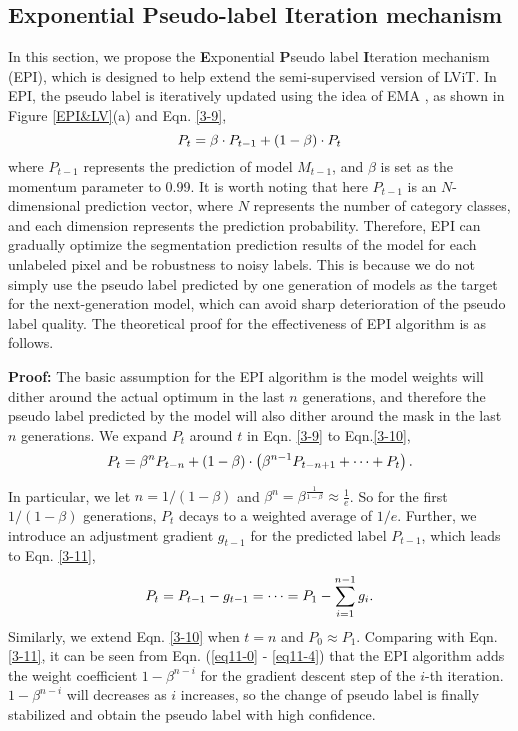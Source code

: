 \documentclass[lettersize,journal]{IEEEtran}
\begin{document}
\subsection{\textbf{E}xponential \textbf{P}seudo-label \textbf{I}teration mechanism}
In this section, we propose the \textbf{E}xponential \textbf{P}seudo label \textbf{I}teration mechanism (EPI), which is designed to help extend the semi-supervised version of LViT. In EPI, the pseudo label is iteratively updated using the idea of EMA \cite{7grill2020bootstrap}, as shown in Figure \ref{EPI&LV}(a) and Eqn. \ref{3-9},
\begin{equation}
    \setlength{\belowdisplayskip}{3pt}
    P_{t}=\beta \cdot P_{t-1}+(1-\beta) \cdot P_{t}
    \setlength{\abovedisplayskip}{3pt}
    \label{3-9}
\end{equation}
where $P_{t-1}$ represents the prediction of model $M_{t-1}$, and $\beta$ is set as the momentum parameter to 0.99. It is worth noting that here $P_{t-1}$ is an $N$-dimensional prediction vector, where $N$ represents the number of category classes, and each dimension represents the prediction probability. Therefore, EPI can gradually optimize the segmentation prediction results of the model for each unlabeled pixel and be robustness to noisy labels. This is because we do not simply use the pseudo label predicted by one generation of models as the target for the next-generation model, which can avoid sharp deterioration of the pseudo label quality. The theoretical proof for the effectiveness of EPI algorithm is as follows.

\textbf{Proof:} The basic assumption for the EPI algorithm is the model weights will dither around the actual optimum in the last $n$ generations, and therefore the pseudo label predicted by the model will also dither around the mask in the last $n$ generations. We expand $P_{t}$ around $t$ in Eqn. \ref{3-9} to Eqn.\ref{3-10},
\vspace{1mm}
\begin{equation}
    \setlength{\belowdisplayskip}{1pt}
    P_{t}=\beta^{n}P_{t-n}+(1-\beta) \cdot\left(\beta^{n-1} P_{t-n+1}+\cdots+P_{t}\right).
    \setlength{\abovedisplayskip}{1pt}
    \label{3-10}
\end{equation}

In particular, we let $n=1/(1-\beta)$ and $\beta^{n}=\beta^{\frac{1}{1-\beta}} \approx \frac{1}{e}$. So for the first $1/(1-\beta)$ generations, $P_{t}$ decays to a weighted average of $1/e$. Further, we introduce an adjustment gradient $g_{t-1}$ for the predicted label $P_{t-1}$, which leads to Eqn. \ref{3-11},
\begin{equation}
    \setlength{\belowdisplayskip}{1pt}
    P_{t}=P_{t-1}-g_{t-1}=\cdots=P_{1}-\sum_{i=1}^{n-1} g_{i}.
    \setlength{\abovedisplayskip}{1pt}
    \label{3-11}
\end{equation}
Similarly, we extend Eqn. \ref{3-10} when $t=n$ and $P_{0}\approx P_{1}$. 
Comparing with Eqn.\ref{3-11}, it can be seen from Eqn. (\ref{eq11-0} - \ref{eq11-4}) that the EPI algorithm adds the weight coefficient $1-\beta^{n-i}$ for the gradient descent step of the $i$-th iteration. $1-\beta^{n-i}$ will decreases as $i$ increases, so the change of pseudo label is finally stabilized and obtain the pseudo label with high confidence. 
\end{document}
